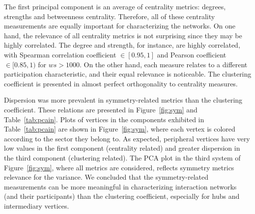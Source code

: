 \documentclass[%
 aip,
 jmp,%
 amsmath,amssymb,
 reprint,%
]{revtex4-1}
\begin{document}
The first principal component is an average of centrality metrics: degrees, strengths and betweenness centrality. Therefore, all of these centrality measurements are equally important for characterizing the networks. On one hand, the relevance of all centrality metrics is not surprising since they may be highly correlated. The degree and strength, for instance, are highly correlated, with Spearman correlation coefficient $\in [0.95,1]$ and Pearson coefficient $\in [0.85,1)$ for $ws>1000$.
On the other hand, each measure relates to a different participation characteristic, and their equal relevance is noticeable.
The clustering coefficient is presented in almost perfect orthogonality to centrality measures.

Dispersion was more prevalent in symmetry-related metrics than the clustering coefficient. These relations are presented in Figure~\ref{fig:sym} and Table~\ref{tab:pcain}.
Plots of vertices in the components exhibited in Table~\ref{tab:pcain} are shown in Figure~\ref{fig:sym}, where each vertex is colored according to the sector they belong to. As expected, peripheral vertices have very low values in the first component (centrality related) and greater dispersion in the third component (clustering related).
The PCA plot in the third system of Figure~\ref{fig:sym}, where all metrics are considered, reflects symmetry metrics relevance for the variance.
We concluded that the symmetry-related measurements can be more meaningful in characterizing interaction networks (and their participants) than the clustering coefficient, especially for hubs and intermediary vertices.


\end{document}
